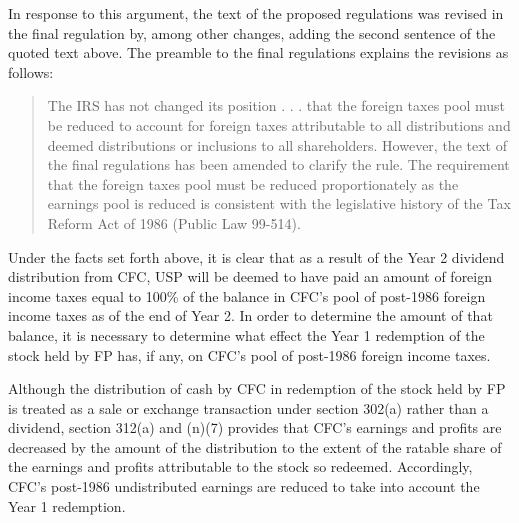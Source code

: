 \begin{select}
In response to this argument, the text of the proposed regulations was revised in the final regulation by, among other changes, adding the second sentence of the quoted text above. The preamble to the final regulations explains the revisions as follows:

\begin{quotation}
The IRS has not changed its position . . . that the foreign taxes pool must be reduced to account for foreign taxes attributable to all distributions and deemed distributions or inclusions to all shareholders. However, the text of the final regulations has been amended to clarify the rule. The requirement that the foreign taxes pool must be reduced proportionately as the earnings pool is reduced is consistent with the legislative history of the Tax Reform Act of 1986 (Public Law 99-514). 
\end{quotation}

Under the facts set forth above, it is clear that as a result of the Year 2 dividend distribution from CFC, USP will be deemed to have paid an amount of foreign income taxes equal to 100\% of the balance in CFC's pool of post-1986 foreign income taxes as of the end of Year 2. In order to determine the amount of that balance, it is necessary to determine what effect the Year 1 redemption of the stock held by FP has, if any, on CFC's pool of post-1986 foreign income taxes.

Although the distribution of cash by CFC in redemption of the stock held by FP is treated as a sale or exchange transaction under section 302(a) rather than a dividend, section 312(a) and (n)(7) provides that CFC's earnings and profits are decreased by the amount of the distribution to the extent of the ratable share of the earnings and profits attributable to the stock so redeemed. Accordingly, CFC's post-1986 undistributed earnings are reduced to take into account the Year 1 redemption.


\end{select}
